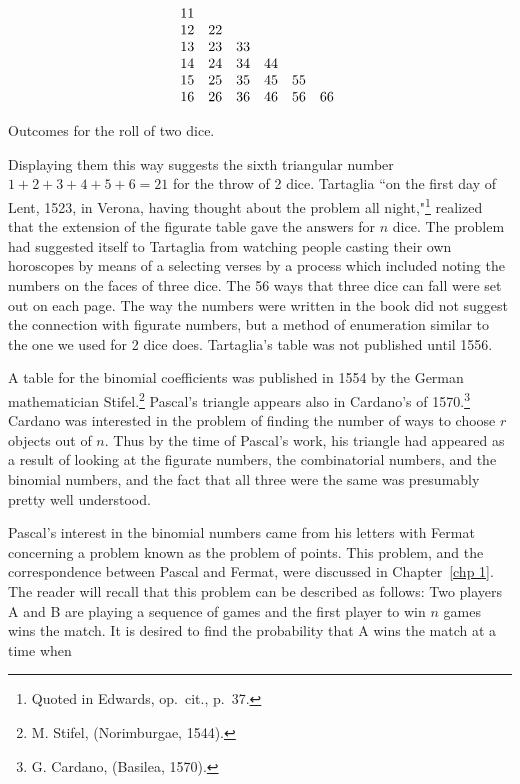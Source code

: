 \begin{table}
\centering
$$\begin{matrix}  11\cr   12 & 22\cr   13 & 23 & 33\cr   14 & 24 & 34 & 44\cr   15 & 25 & 35
& 45 & 55\cr   16 & 26 & 36 & 46 & 56 & 66\ \cr \end{matrix}
$$
\caption{Outcomes for the roll of two dice.}
\label{table 3.10}
\end{table}

Displaying them this way suggests the sixth triangular number $1 + 2 + 3 + 4 + 5 + 6 =
21$ for the throw of 2 dice.  Tartaglia ``on the first day of Lent, 1523, in Verona,
having thought about the problem all night,"\footnote{Quoted in Edwards, op.\ cit., p.~37.} realized
that the extension of the figurate table gave the answers for $n$ dice.  The problem had suggested
itself to Tartaglia from watching people casting their own horoscopes by means of a  selecting verses by a process which included noting the numbers on the faces of three
dice.  The 56 ways that three dice can fall were set out on each page.  The way the numbers were
written in the book did not suggest the connection with figurate numbers, but a method
of enumeration similar to the one we used for 2 dice does.  Tartaglia's table was not
published until 1556.
\par
A table for the binomial coefficients was published in 1554 by the German
mathematician Stifel.\footnote{M. Stifel,  (Norimburgae,
1544).}  Pascal's triangle appears also in Cardano's  of
1570.\footnote{G. Cardano,  (Basilea,
1570).}  Cardano was interested in the problem of finding the number of ways to choose
$r$ objects out of $n$.  Thus by the time of Pascal's work, his triangle had appeared
as a result of looking at the figurate numbers, the combinatorial numbers, and the
binomial numbers, and the fact that all three were the same was presumably pretty well
understood.
\par
Pascal's interest in the binomial numbers came from his
letters with Fermat concerning a problem known as the problem
of points.  This problem, and the correspondence between Pascal and
Fermat, were discussed in Chapter~\ref{chp 1}.  The reader will recall that this problem can be
described as follows: Two players A and B are playing a sequence of games and the first player to win
$n$ games wins the match.  It is desired to find the probability that A wins the match at a time when

